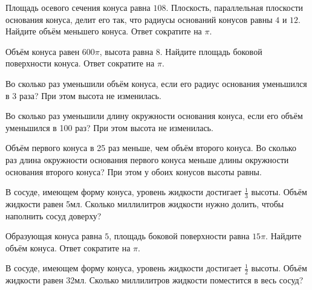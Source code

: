 \documentclass[a4paper]{article}
\begin{document}
\begin{taskBN}{38}
Площадь осевого сечения конуса равна $108$. Плоскость, параллельная плоскости основания конуса,  делит его так, что радиусы оснований конусов равны $4$ и $12$. Найдите объём меньшего конуса. Ответ сократите на $\pi$.
\end{taskBN}

\begin{taskBN}{39}
Объём конуса равен $600\pi$, высота равна $8$. Найдите площадь боковой поверхности конуса. Ответ сократите на $\pi$.
\end{taskBN}

\begin{taskBN}{40}
Во сколько раз уменьшили объём конуса, если его радиус основания уменьшился в 3 раза? При этом высота не изменилась.
\end{taskBN}

\begin{taskBN}{41}
Во сколько раз уменьшили длину окружности основания конуса, если его объём уменьшился в 100 раз? При этом высота не изменилась.
\end{taskBN}

\begin{taskBN}{42}
Объём первого конуса в 25 раз меньше, чем объём второго конуса. Во сколько раз длина окружности основания первого конуса меньше длины окружности основания второго конуса? При этом у обоих конусов высоты равны.
\end{taskBN}

\begin{taskBN}{43}
В сосуде, имеющем форму конуса, уровень жидкости достигает $\frac{1}{3}$ высоты. Объём жидкости равен 5мл. Сколько миллилитров жидкости нужно долить, чтобы наполнить сосуд доверху?
\end{taskBN}

\begin{taskBN}{44}
Образующая конуса равна $5$, площадь боковой поверхности равна $15\pi$. Найдите объём конуса. Ответ сократите на $\pi$.
\end{taskBN}

\begin{taskBN}{45}
В сосуде, имеющем форму конуса, уровень жидкости достигает $\frac{1}{2}$ высоты. Объём жидкости равен 32мл. Сколько миллилитров жидкости поместится в весь сосуд?
\end{taskBN}
\end{document}
